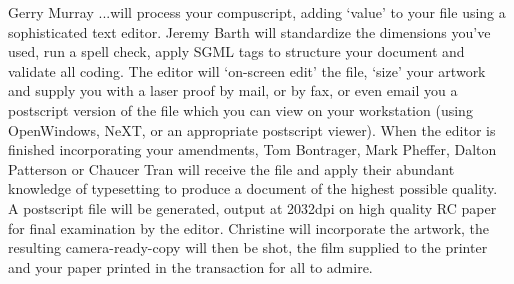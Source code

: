 \begin{yourbiography}{Gerry Murray}
...will process your compuscript, adding `value' to your file using a
sophisticated text editor. Jeremy Barth will standardize the dimensions
you've used, run a spell check, apply SGML tags to structure your
document and validate all coding. The editor will `on-screen edit' the
file, `size' your artwork and supply you with a laser proof by mail, or
by fax, or even email you a postscript version of the file which you can
view on your workstation (using OpenWindows, NeXT, or an appropriate
postscript viewer). When the editor is finished incorporating your
amendments, Tom Bontrager, Mark Pheffer, Dalton Patterson or Chaucer
Tran will receive the file and apply their abundant knowledge of
typesetting to produce a document of the highest possible quality. A
postscript file will be generated, output at 2032dpi on high quality RC
paper for final examination by the editor. Christine will incorporate
the artwork, the resulting camera-ready-copy will then be shot, the film
supplied to the printer and your paper printed in the transaction for
all to admire.  
\end{yourbiography}



